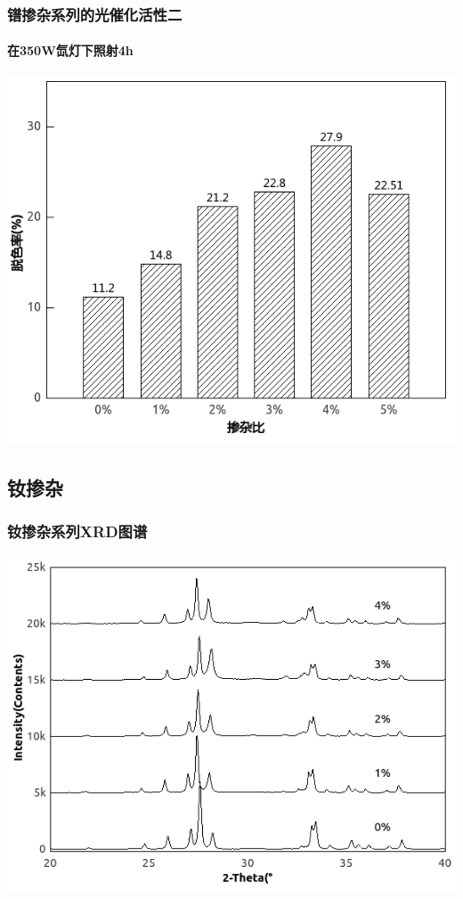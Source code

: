 \documentclass[xetex,compress]{mybeamer}
\begin{document}
\begin{frame}
\frametitle{镨掺杂系列的光催化活性二}
\framesubtitle{在350W氙灯下照射4h}
\begin{block}{}
\centering
\includegraphics[scale=6]{figures/镨掺杂活性2.jpg} 
\end{block}
\end{frame}


\subsection{钕掺杂}
\begin{frame}
\frametitle{钕掺杂系列XRD图谱}
\begin{block}{}
\centering
\includegraphics[scale=7]{figures/钕掺杂XRD.jpg} 
\end{block}
\end{frame}
\end{document}
